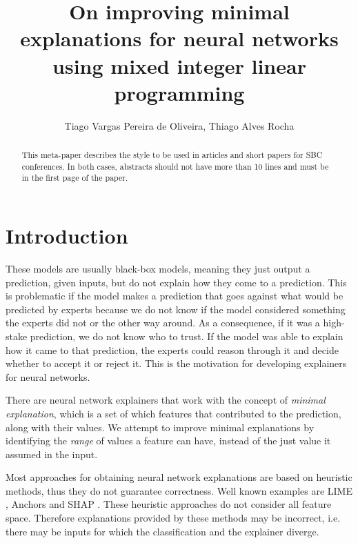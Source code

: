 \documentclass[12pt]{article}
\title{On improving minimal explanations for neural networks using mixed integer linear programming}
\author{Tiago Vargas Pereira de Oliveira\inst{1}, Thiago Alves Rocha\inst{1}}
\begin{document}
\maketitle

\begin{abstract}
	This meta-paper describes the style to be used in articles and short papers for SBC conferences. In both cases, abstracts should not have more than 10 lines and must be in the first page of the paper.
\end{abstract}

\section{Introduction}


These models are usually black-box models, meaning they just output a prediction, given inputs, but do not explain how they come to a prediction.
This is problematic if the model makes a prediction that goes against what would be predicted by experts because we do not know if the model considered something the experts did not or the other way around.
As a consequence, if it was a high-stake prediction, we do not know who to trust.
If the model was able to explain how it came to that prediction, the experts could reason through it and decide whether to accept it or reject it.
This is the motivation for developing explainers for neural networks.



There are neural network explainers that work with the concept of \emph{minimal explanation}, which is a set of which features that contributed to the prediction, along with their values.
We attempt to improve minimal explanations by identifying the \emph{range} of values a feature can have, instead of the just value it assumed in the input.


Most approaches for obtaining neural network explanations are based on heuristic methods, thus they do not guarantee correctness.
Well known examples are LIME \cite{ribeiro2016should}, Anchors \cite{Ribeiro_Singh_Guestrin_2018} and SHAP \cite{lundberg2017unified}.
These heuristic approaches do not consider all feature space. Therefore explanations provided by these methods may be incorrect, i.e. there may be inputs for which the classification and the explainer diverge.
\end{document}
